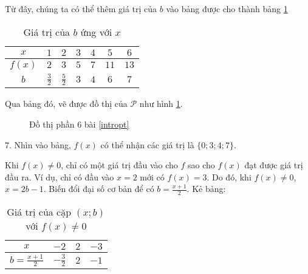 Từ đây, chúng ta có thể thêm giá trị của $b$ vào bảng được cho thành bảng \ref{tab:b_values6}

\begin{table}[h]
   \centering
   \begin{tabular}{|c|c|c|c|c|c|c|}
      \hline
      $x$ & $1$ & $2$ & $3$ & $4$ & $5$ & $6$\\
      \hline
      $f(x)$ & $2$ & $3$ & $5$ & $7$ & $11$ & $13$\\
      \hline
      $b$ & $\frac{3}{2}$ & $\frac{5}{2}$ & $3$ & $4$ & $6$ & $7$\\
      \hline
   \end{tabular}
   \caption{Giá trị của $b$ ứng với $x$}
   \label{tab:b_values6}
\end{table}

Qua bảng đó, vẽ được đồ thị của $\mathcal{P}$ như hình \ref{fig:dtp6}.

\begin{figure}[h]
   \centering
   \caption{Đồ thị phần 6 bài \ref{intropt}}
   \label{fig:dtp6}
\end{figure}

7. Nhìn vào bảng, $f(x)$ có thể nhận các giá trị là $\{0; 3; 4; 7\}$.

Khi $f(x) \neq 0$, chỉ có một giá trị đầu vào cho $f$ sao cho $f(x)$ đạt được giá trị đầu ra. Ví dụ, chỉ có đầu vào $x = 2$ mới có $f(x) = 3$. Do đó, khi $f(x) \neq 0$, $x = 2b-1$. Biến đổi đại số cơ bản để có $b = \frac{x + 1}{2}$. Kẻ bảng:

\begin{table}[h]
   \centering
   \begin{tabular}{|c|c|c|c|}
      \hline
      $x$ & $-2$ & $2$ & $-3$\\
      \hline
      $b = \frac{x+1}{2}$ & $-\frac{3}{2}$ & $2$ & $-1$\\
      \hline
   \end{tabular}
   \caption{Giá trị của cặp $(x; b)$ với $f(x) \neq 0$}
   \label{tab:b_values7}
\end{table}


